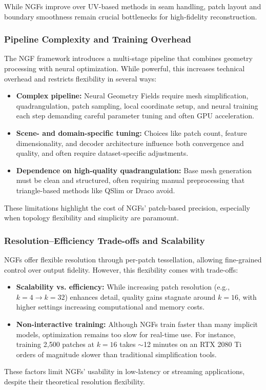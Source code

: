 While NGFs improve over UV-based methods in seam handling, patch layout and boundary smoothness remain crucial bottlenecks for high-fidelity reconstruction. 

\subsubsection{Pipeline Complexity and Training Overhead}

The NGF framework introduces a multi-stage pipeline that combines geometry processing with neural optimization. 
While powerful, this increases technical overhead and restricts flexibility in several ways: 

\begin{itemize}
    \item \textbf{Complex pipeline:} Neural Geometry Fields require mesh simplification, quadrangulation, patch sampling, local coordinate setup, and neural training each step demanding careful parameter tuning and often GPU acceleration.
    \item \textbf{Scene- and domain-specific tuning:} Choices like patch count, feature dimensionality, and decoder architecture influence both convergence and quality, and often require dataset-specific adjustments.
    \item \textbf{Dependence on high-quality quadrangulation:} Base mesh generation must be clean and structured, often requiring manual preprocessing that triangle-based methods like QSlim or Draco avoid.
\end{itemize}

These limitations highlight the cost of NGFs' patch-based precision, especially when topology flexibility and simplicity are paramount. 

\subsubsection{Resolution–Efficiency Trade-offs and Scalability}

NGFs offer flexible resolution through per-patch tessellation, allowing fine-grained control over output fidelity. 
However, this flexibility comes with trade-offs: 

\begin{itemize}
    \item \textbf{Scalability vs. efficiency:} While increasing patch resolution (e.g., $k = 4 \rightarrow k = 32$) enhances detail, quality gains stagnate around $k = 16$, with higher settings increasing computational and memory costs.
    \item \textbf{Non-interactive training:} Although NGFs train faster than many implicit models, optimization remains too slow for real-time use. For instance, training 2,500 patches at $k = 16$ takes $\sim$12 minutes on an RTX 2080 Ti orders of magnitude slower than traditional simplification tools.
\end{itemize}

These factors limit NGFs' usability in low-latency or streaming applications, despite their theoretical resolution flexibility. 
